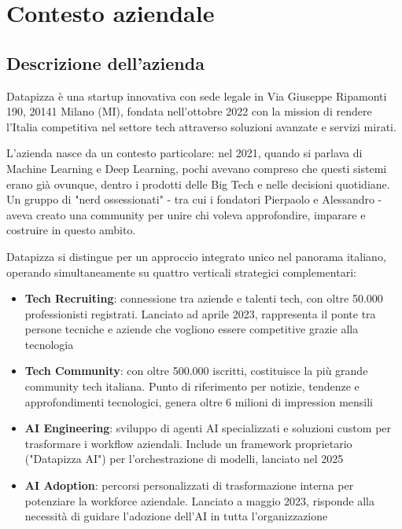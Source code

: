 \chapter{Contesto aziendale}

\section{Descrizione dell'azienda}
Datapizza è una startup innovativa con sede legale in Via Giuseppe Ripamonti 190, 20141 Milano (MI), fondata nell'ottobre 2022 con la mission di rendere l'Italia competitiva nel settore tech attraverso soluzioni avanzate e servizi mirati.

L'azienda nasce da un contesto particolare: nel 2021, quando si parlava di Machine Learning e Deep Learning, pochi avevano compreso che questi sistemi erano già ovunque, dentro i prodotti delle Big Tech e nelle decisioni quotidiane. Un gruppo di "nerd ossessionati" - tra cui i fondatori Pierpaolo e Alessandro - aveva creato una community per unire chi voleva approfondire, imparare e costruire in questo ambito.

Datapizza si distingue per un approccio integrato unico nel panorama italiano, operando simultaneamente su quattro verticali strategici complementari:

\begin{itemize}
  \item \textbf{Tech Recruiting}: connessione tra aziende e talenti tech, con oltre 50.000 professionisti registrati. Lanciato ad aprile 2023, rappresenta il ponte tra persone tecniche e aziende che vogliono essere competitive grazie alla tecnologia
  
  \item \textbf{Tech Community}: con oltre 500.000 iscritti, costituisce la più grande community tech italiana. Punto di riferimento per notizie, tendenze e approfondimenti tecnologici, genera oltre 6 milioni di impression mensili
  
  \item \textbf{AI Engineering}: sviluppo di agenti AI specializzati e soluzioni custom per trasformare i workflow aziendali. Include un framework proprietario ("Datapizza AI") per l'orchestrazione di modelli, lanciato nel 2025
  
  \item \textbf{AI Adoption}: percorsi personalizzati di trasformazione interna per potenziare la workforce aziendale. Lanciato a maggio 2023, risponde alla necessità di guidare l'adozione dell'AI in tutta l'organizzazione
\end{itemize}

